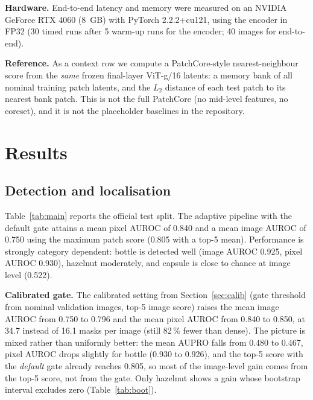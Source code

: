 \documentclass[conference]{IEEEtran}
\begin{document}
\textbf{Hardware.} End-to-end latency and memory were measured on an NVIDIA GeForce RTX 4060 (8~GB) with PyTorch 2.2.2+cu121, using the encoder in FP32 (30 timed runs after 5 warm-up runs for the encoder; 40 images for end-to-end).

\textbf{Reference.} As a context row we compute a PatchCore-style nearest-neighbour score from the \emph{same} frozen final-layer ViT-g/16 latents: a memory bank of all nominal training patch latents, and the $L_2$ distance of each test patch to its nearest bank patch. This is not the full PatchCore (no mid-level features, no coreset), and it is not the placeholder baselines in the repository.

\section{Results}\label{sec:results}

\subsection{Detection and localisation}
Table~\ref{tab:main} reports the official test split. The adaptive pipeline with the default gate attains a mean pixel AUROC of 0.840 and a mean image AUROC of 0.750 using the maximum patch score (0.805 with a top-5 mean). Performance is strongly category dependent: bottle is detected well (image AUROC 0.925, pixel AUROC 0.930), hazelnut moderately, and capsule is close to chance at image level (0.522).

\textbf{Calibrated gate.} The calibrated setting from Section~\ref{sec:calib} (gate threshold from nominal validation images, top-5 image score) raises the mean image AUROC from 0.750 to 0.796 and the mean pixel AUROC from 0.840 to 0.850, at 34.7 instead of 16.1 masks per image (still 82\,\% fewer than dense). The picture is mixed rather than uniformly better: the mean AUPRO falls from 0.480 to 0.467, pixel AUROC drops slightly for bottle (0.930 to 0.926), and the top-5 score with the \emph{default} gate already reaches 0.805, so most of the image-level gain comes from the top-5 score, not from the gate. Only hazelnut shows a gain whose bootstrap interval excludes zero (Table~\ref{tab:boot}).
\end{document}

